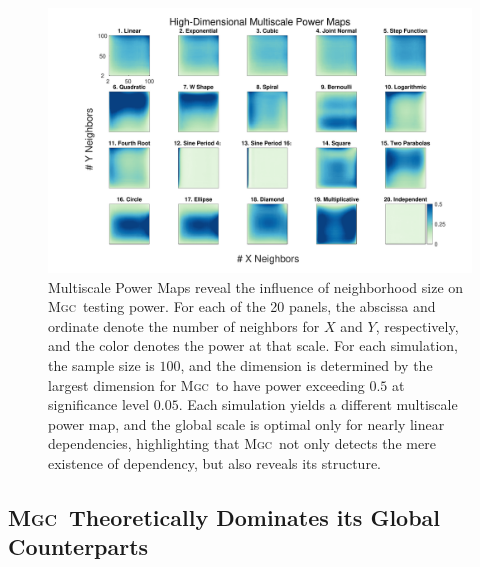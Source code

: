 \documentclass[11pt]{article}
\providecommand{\sct}[1]{{\normalfont\textsc{#1}}}
\newcommand{\Mgc}{\sct{Mgc}}
\begin{document}
\begin{figure}[htbp]
\includegraphics[width=1.0\textwidth,trim={3cm 0.5cm 2.5cm 0.5cm},clip]{Figures/FigHDHeat}
\caption{Multiscale Power Maps reveal the influence of neighborhood size on \Mgc~testing power.
For each of the 20 panels, the abscissa and ordinate denote the number of neighbors for $X$ and  $Y$, respectively, and the color denotes the power at that scale. For each simulation, the sample size is $100$,  and the dimension is determined by the largest dimension for \Mgc~to have power exceeding $0.5$ at significance level $0.05$. Each simulation yields a different multiscale power map, and the global scale is optimal only for nearly linear dependencies, highlighting that \Mgc~not only detects the mere existence of dependency, but also reveals its  structure.}
\label{f:powermaps}
\end{figure}


\subsection*{\Mgc~Theoretically Dominates its Global Counterparts}
\label{s:theory}
\end{document}
